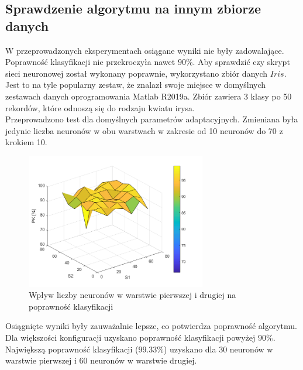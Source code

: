 \subsection{Sprawdzenie algorytmu na innym zbiorze danych}\label{eksperyment6}
W przeprowadzonych eksperymentach osiągane wyniki nie były zadowalające. Poprawność klasyfikacji nie przekroczyła nawet $90\%$. Aby sprawdzić czy skrypt sieci neuronowej został wykonany poprawnie, wykorzystano zbiór danych $Iris$. Jest to na tyle popularny zestaw, że znalazł swoje miejsce w domyślnych zestawach danych oprogramowania Matlab R2019a. Zbiór zawiera 3 klasy po 50 rekordów, które odnoszą się do rodzaju kwiatu irysa.\\
Przeprowadzono test dla domyślnych parametrów adaptacyjnych. Zmieniana była jedynie liczba neuronów w obu warstwach w zakresie od 10 neuronów do 70 z krokiem 10.
\begin{figure}[!h]
\centering
\includegraphics[width = 0.7\textwidth]{Grafika/iris_PK.png}
\caption{Wpływ liczby neuronów w warstwie pierwszej i drugiej na poprawność klasyfikacji}
\label{fig:iris_PK}
\end{figure}

Osiągnięte wyniki były zauważalnie lepsze, co potwierdza poprawność algorytmu. Dla większości konfiguracji uzyskano poprawność klasyfikacji powyżej $90\%$. Największą poprawność klasyfikacji ($99.33\%$) uzyskano dla 30 neuronów w warstwie pierwszej i 60 neuronów w warstwie drugiej.